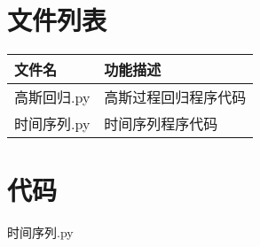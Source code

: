 \documentclass[withoutpreface,bwprint]{cumcmthesis}
\begin{document}
\nocite{*}

\newpage
\begin{appendices}
\section{文件列表}
\begin{table}[H]
\centering
\begin{tabularx}{\textwidth}{LL}
\toprule
文件名   & 功能描述 \\
\midrule
高斯回归.py & 高斯过程回归程序代码 \\
时间序列.py & 时间序列程序代码 \\
\bottomrule
\end{tabularx}
\label{tab:文件列表}
\end{table}

\section{代码}

时间序列.py

% 
% 
\end{appendices}
\end{document}

